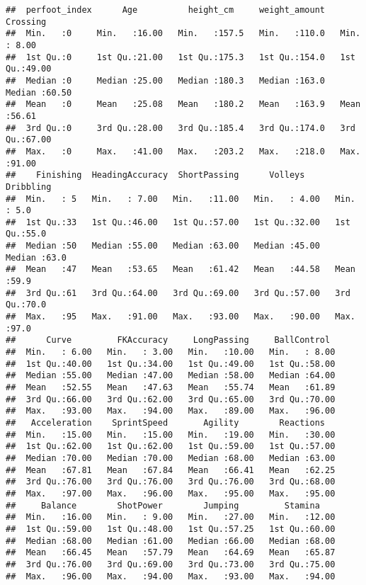 \documentclass[
]{article}
\begin{document}
\begin{verbatim}
##  perfoot_index      Age          height_cm     weight_amount      Crossing    
##  Min.   :0     Min.   :16.00   Min.   :157.5   Min.   :110.0   Min.   : 8.00  
##  1st Qu.:0     1st Qu.:21.00   1st Qu.:175.3   1st Qu.:154.0   1st Qu.:49.00  
##  Median :0     Median :25.00   Median :180.3   Median :163.0   Median :60.50  
##  Mean   :0     Mean   :25.08   Mean   :180.2   Mean   :163.9   Mean   :56.61  
##  3rd Qu.:0     3rd Qu.:28.00   3rd Qu.:185.4   3rd Qu.:174.0   3rd Qu.:67.00  
##  Max.   :0     Max.   :41.00   Max.   :203.2   Max.   :218.0   Max.   :91.00  
##    Finishing  HeadingAccuracy  ShortPassing      Volleys        Dribbling   
##  Min.   : 5   Min.   : 7.00   Min.   :11.00   Min.   : 4.00   Min.   : 5.0  
##  1st Qu.:33   1st Qu.:46.00   1st Qu.:57.00   1st Qu.:32.00   1st Qu.:55.0  
##  Median :50   Median :55.00   Median :63.00   Median :45.00   Median :63.0  
##  Mean   :47   Mean   :53.65   Mean   :61.42   Mean   :44.58   Mean   :59.9  
##  3rd Qu.:61   3rd Qu.:64.00   3rd Qu.:69.00   3rd Qu.:57.00   3rd Qu.:70.0  
##  Max.   :95   Max.   :91.00   Max.   :93.00   Max.   :90.00   Max.   :97.0  
##      Curve         FKAccuracy     LongPassing     BallControl   
##  Min.   : 6.00   Min.   : 3.00   Min.   :10.00   Min.   : 8.00  
##  1st Qu.:40.00   1st Qu.:34.00   1st Qu.:49.00   1st Qu.:58.00  
##  Median :55.00   Median :47.00   Median :58.00   Median :64.00  
##  Mean   :52.55   Mean   :47.63   Mean   :55.74   Mean   :61.89  
##  3rd Qu.:66.00   3rd Qu.:62.00   3rd Qu.:65.00   3rd Qu.:70.00  
##  Max.   :93.00   Max.   :94.00   Max.   :89.00   Max.   :96.00  
##   Acceleration    SprintSpeed       Agility        Reactions    
##  Min.   :15.00   Min.   :15.00   Min.   :19.00   Min.   :30.00  
##  1st Qu.:62.00   1st Qu.:62.00   1st Qu.:59.00   1st Qu.:57.00  
##  Median :70.00   Median :70.00   Median :68.00   Median :63.00  
##  Mean   :67.81   Mean   :67.84   Mean   :66.41   Mean   :62.25  
##  3rd Qu.:76.00   3rd Qu.:76.00   3rd Qu.:76.00   3rd Qu.:68.00  
##  Max.   :97.00   Max.   :96.00   Max.   :95.00   Max.   :95.00  
##     Balance        ShotPower        Jumping         Stamina     
##  Min.   :16.00   Min.   : 9.00   Min.   :27.00   Min.   :12.00  
##  1st Qu.:59.00   1st Qu.:48.00   1st Qu.:57.25   1st Qu.:60.00  
##  Median :68.00   Median :61.00   Median :66.00   Median :68.00  
##  Mean   :66.45   Mean   :57.79   Mean   :64.69   Mean   :65.87  
##  3rd Qu.:76.00   3rd Qu.:69.00   3rd Qu.:73.00   3rd Qu.:75.00  
##  Max.   :96.00   Max.   :94.00   Max.   :93.00   Max.   :94.00  

\end{verbatim}
\end{document}
